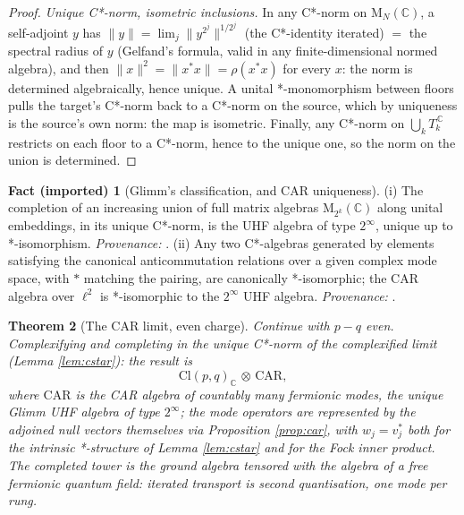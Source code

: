 \documentclass[11pt]{article}
\newtheorem{theorem}{Theorem}[section]
\theoremstyle{definition}
\newtheorem{fact}[theorem]{Fact (imported)}
\newcommand{\Cl}{\mathrm{Cl}}
\newcommand{\C}{\mathbb{C}}
\newcommand{\Mat}{\mathrm{M}}
\newcommand{\CAR}{\mathrm{CAR}}
\begin{document}
\begin{proof}
\emph{Unique C*-norm, isometric inclusions.} In any C*-norm on $\Mat_N(\C)$, a self-adjoint $y$ has $\|y\| = \lim_j \|y^{2^j}\|^{1/2^j}$ (the C*-identity iterated) $=$ the spectral radius of $y$ (Gelfand's formula, valid in any finite-dimensional normed algebra), and then $\|x\|^2 = \|x^*x\| = \rho(x^* x)$ for every $x$: the norm is determined algebraically, hence unique. A unital *-monomorphism between floors pulls the target's C*-norm back to a C*-norm on the source, which by uniqueness is the source's own norm: the map is isometric. Finally, any C*-norm on $\bigcup_k T_k^{\,\C}$ restricts on each floor to a C*-norm, hence to the unique one, so the norm on the union is determined.
\end{proof}

\begin{fact}[Glimm's classification, and CAR uniqueness]\label{fact:uhfcar}
(i) The completion of an increasing union of full matrix algebras $\Mat_{2^k}(\C)$ along unital embeddings, in its unique C*-norm, is the UHF algebra of type $2^\infty$, unique up to *-isomorphism. \emph{Provenance:} \cite{Glimm1960}. (ii) Any two C*-algebras generated by elements satisfying the canonical anticommutation relations over a given complex mode space, with $*$ matching the pairing, are canonically *-isomorphic; the CAR algebra over $\ell^2$ is *-isomorphic to the $2^\infty$ UHF algebra. \emph{Provenance:} \cite[Thm.~5.2.5]{BratteliRobinson1997}.
\end{fact}

\begin{theorem}[The CAR limit, even charge]\label{thm:carlimit}
Continue with $p - q$ even. Complexifying and completing in the unique C*-norm of the complexified limit (Lemma \ref{lem:cstar}): the result is
\[
\Cl(p,q)_\C \,\otimes\, \CAR,
\]
where $\CAR$ is the CAR algebra of countably many fermionic modes, the unique Glimm UHF algebra of type $2^\infty$; the mode operators are represented by the adjoined null vectors themselves via Proposition \ref{prop:car}, with $w_j = v_j^*$ both for the intrinsic *-structure of Lemma \ref{lem:cstar} and for the Fock inner product. The completed tower is the ground algebra tensored with the algebra of a free fermionic quantum field: iterated transport is second quantisation, one mode per rung.
\end{theorem}
\end{document}
